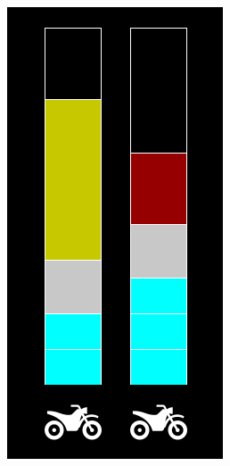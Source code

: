 \documentclass[12pt, a4paper, titlepage]{article}
\begin{document}
\begin{figure}[H]
    \centering
    \begin{minipage}{0.32\textwidth}
        \includegraphics[width=\textwidth]{res/Empacotamento.png}

\end{minipage}
\end{figure}
\end{document}
